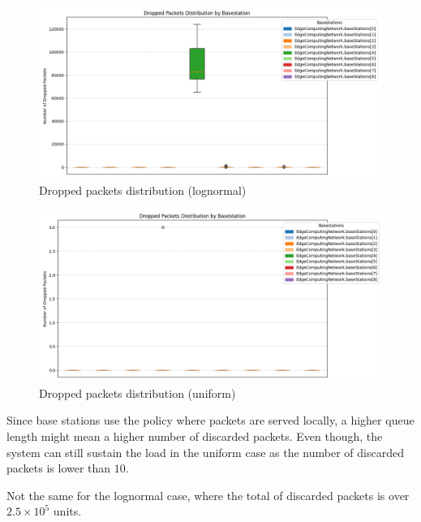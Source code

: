 \documentclass{report}
\begin{document}
\begin{figure}[H]
    \centering
    \includegraphics[width=\textwidth]{img/plots/log_1e3_A/dropped.png}
    \caption{Dropped packets distribution (lognormal)}
\end{figure}

\begin{figure}[H]
    \centering
    \includegraphics[width=\textwidth]{img/plots/uni_1e3_A/dropped.png}
    \caption{Dropped packets distribution (uniform)}
\end{figure}

\begin{flushleft}
Since base stations use the policy where packets are served locally, a higher queue length might mean a higher number of discarded packets. Even though, the system can still sustain the load in the uniform case as the number of discarded packets is lower than $10$.

\vspace{1em} 

Not the same for the lognormal case, where the total of discarded packets is over $2.5\times10^5$ units.
\end{flushleft}

\vspace{10mm}
\end{document}
